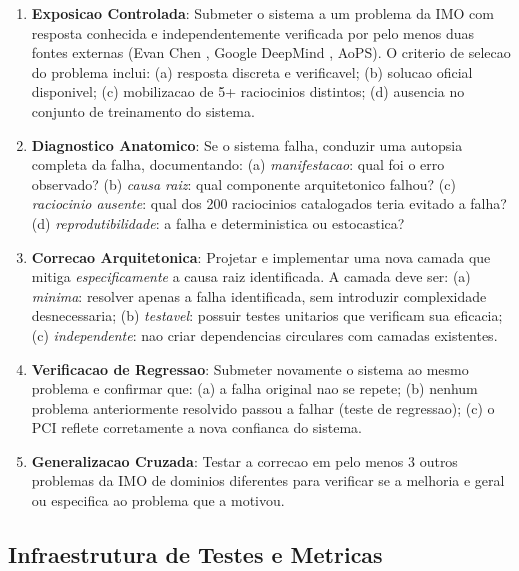 \documentclass[5p]{elsarticle}
\begin{document}
\begin{enumerate}[label=\textbf{Passo \arabic*}:,leftmargin=*]
  \item \textbf{Exposicao Controlada}: Submeter o sistema a um problema da IMO
    com resposta conhecida e independentemente verificada por pelo menos duas
    fontes externas (Evan Chen \cite{chen2025}, Google DeepMind
    \cite{deepmind2025}, AoPS). O criterio de selecao do problema inclui:
    (a) resposta discreta e verificavel; (b) solucao oficial disponivel;
    (c) mobilizacao de 5+ raciocinios distintos; (d) ausencia no conjunto de
    treinamento do sistema.

  \item \textbf{Diagnostico Anatomico}: Se o sistema falha, conduzir uma
    autopsia completa da falha, documentando: (a) \textit{manifestacao}:
    qual foi o erro observado? (b) \textit{causa raiz}: qual componente
    arquitetonico falhou? (c) \textit{raciocinio ausente}: qual dos 200
    raciocinios catalogados teria evitado a falha? (d) \textit{reprodutibilidade}:
    a falha e deterministica ou estocastica?

  \item \textbf{Correcao Arquitetonica}: Projetar e implementar uma nova camada
    que mitiga \textit{especificamente} a causa raiz identificada. A camada
    deve ser: (a) \textit{minima}: resolver apenas a falha identificada, sem
    introduzir complexidade desnecessaria; (b) \textit{testavel}: possuir
    testes unitarios que verificam sua eficacia; (c) \textit{independente}:
    nao criar dependencias circulares com camadas existentes.

  \item \textbf{Verificacao de Regressao}: Submeter novamente o sistema ao
    mesmo problema e confirmar que: (a) a falha original nao se repete;
    (b) nenhum problema anteriormente resolvido passou a falhar (teste de
    regressao); (c) o PCI reflete corretamente a nova confianca do sistema.

  \item \textbf{Generalizacao Cruzada}: Testar a correcao em pelo menos 3
    outros problemas da IMO de dominios diferentes para verificar se a
    melhoria e geral ou especifica ao problema que a motivou.
\end{enumerate}

\subsection{Infraestrutura de Testes e Metricas}
\end{document}
